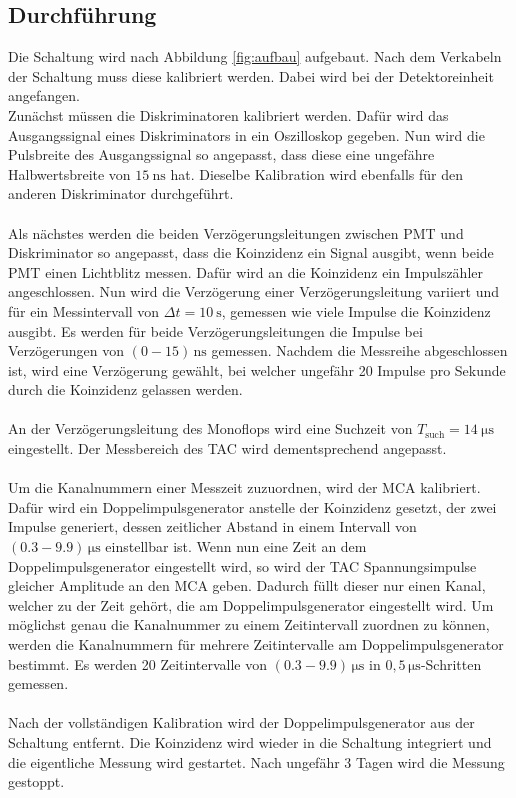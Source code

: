 \subsection{Durchführung}
Die Schaltung wird nach Abbildung \ref{fig:aufbau} aufgebaut.
Nach dem Verkabeln der Schaltung muss diese kalibriert werden.
Dabei wird bei der Detektoreinheit angefangen.\\
Zunächst müssen die Diskriminatoren kalibriert werden.
Dafür wird das Ausgangssignal eines Diskriminators in ein Oszilloskop gegeben.
Nun wird die Pulsbreite des Ausgangssignal so angepasst, dass diese eine ungefähre Halbwertsbreite von $\SI{15}{\nano\second}$ hat.
Dieselbe Kalibration wird ebenfalls für den anderen Diskriminator durchgeführt.\\\\
Als nächstes werden die beiden Verzögerungsleitungen zwischen PMT und Diskriminator so angepasst, dass die Koinzidenz ein Signal ausgibt, wenn beide PMT einen Lichtblitz messen.
Dafür wird an die Koinzidenz ein Impulszähler angeschlossen.
Nun wird die Verzögerung einer Verzögerungsleitung variiert und für ein Messintervall von $\Delta t = \SI{10}{\second}$, gemessen wie viele Impulse die Koinzidenz ausgibt.
Es werden für beide Verzögerungsleitungen die Impulse bei Verzögerungen von $(0-15)\,\si{\nano\second}$ gemessen.
Nachdem die Messreihe abgeschlossen ist, wird eine Verzögerung gewählt, bei welcher ungefähr 20 Impulse pro Sekunde durch die Koinzidenz gelassen werden.\\\\
An der Verzögerungsleitung des Monoflops wird eine Suchzeit von $T_\text{such} = \SI{14}{\micro\second}$ eingestellt.
Der Messbereich des TAC wird dementsprechend angepasst.\\\\
Um die Kanalnummern einer Messzeit zuzuordnen, wird der MCA kalibriert.
Dafür wird ein Doppelimpulsgenerator anstelle der Koinzidenz gesetzt, der zwei Impulse generiert, dessen zeitlicher Abstand in einem Intervall von $(0.3-9.9)\,\si{\micro\second}$ einstellbar ist.
Wenn nun eine Zeit an dem Doppelimpulsgenerator eingestellt wird, so wird der TAC Spannungsimpulse gleicher Amplitude an den MCA geben.
Dadurch füllt dieser nur einen Kanal, welcher zu der Zeit gehört, die am Doppelimpulsgenerator eingestellt wird.
Um möglichst genau die Kanalnummer zu einem Zeitintervall zuordnen zu können, werden die Kanalnummern für mehrere Zeitintervalle am Doppelimpulsgenerator bestimmt.
Es werden 20 Zeitintervalle von $(0.3-9.9)\,\si{\micro\second}$ in $0,5\,\si{\micro\second}$-Schritten gemessen.\\\\
Nach der vollständigen Kalibration wird der Doppelimpulsgenerator aus der Schaltung entfernt.
Die Koinzidenz wird wieder in die Schaltung integriert und die eigentliche Messung wird gestartet.
Nach ungefähr 3 Tagen wird die Messung gestoppt.